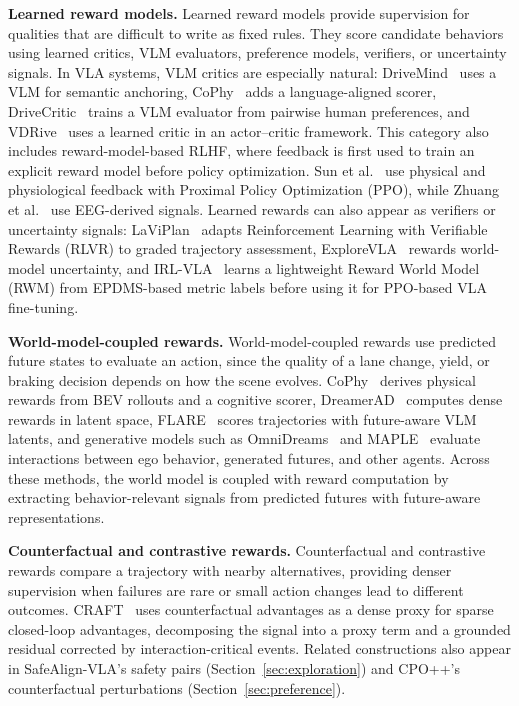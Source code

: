 \documentclass[runningheads]{llncs}
\begin{document}
\textbf{Learned reward models.}
Learned reward models provide supervision for qualities that are difficult to write as fixed rules. They score candidate behaviors using learned critics, VLM evaluators, preference models, verifiers, or uncertainty signals. In VLA systems, VLM critics are especially natural: DriveMind~\cite{drivemind2025} uses a VLM for semantic anchoring, CoPhy~\cite{cophy2026} adds a language-aligned scorer, DriveCritic~\cite{drivecritic2025} trains a VLM evaluator from pairwise human preferences, and VDRive~\cite{vdrive2025} uses a learned critic in an actor–critic framework. This category also includes reward-model-based RLHF, where feedback is first used to train an explicit reward model before policy optimization. Sun et al.~\cite{sun2024rlhf} use physical and physiological feedback with Proximal Policy Optimization (PPO), while Zhuang et al.~\cite{neurocog2026} use EEG-derived signals. Learned rewards can also appear as verifiers or uncertainty signals: LaViPlan~\cite{laviplan2025} adapts Reinforcement Learning with Verifiable Rewards (RLVR) to graded trajectory assessment, ExploreVLA~\cite{explorevla2026} rewards world-model uncertainty, and IRL-VLA~\cite{jiang2025irl} learns a lightweight Reward World Model (RWM) from EPDMS-based metric labels before using it for PPO-based VLA fine-tuning.

\textbf{World-model-coupled rewards.}
World-model-coupled rewards use predicted future states to evaluate an action, since the quality of a lane change, yield, or braking decision depends on how the scene evolves. CoPhy~\cite{cophy2026} derives physical rewards from BEV rollouts and a cognitive scorer, DreamerAD~\cite{dreamerad2026} computes dense rewards in latent space, FLARE~\cite{flare2026} scores trajectories with future-aware VLM latents, and generative models such as OmniDreams~\cite{omnidreams2026} and MAPLE~\cite{maple2026} evaluate interactions between ego behavior, generated futures, and other agents. Across these methods, the world model is coupled with reward computation by extracting behavior-relevant signals from predicted futures with future-aware representations.


\textbf{Counterfactual and contrastive rewards.}
Counterfactual and contrastive rewards compare a trajectory with nearby alternatives, providing denser supervision when failures are rare or small action changes lead to different outcomes. CRAFT~\cite{craft2026} uses counterfactual advantages as a dense proxy for sparse closed-loop advantages, decomposing the signal into a proxy term and a grounded residual corrected by interaction-critical events. Related constructions also appear in SafeAlign-VLA’s safety pairs (Section~\ref{sec:exploration}) and CPO++’s counterfactual perturbations (Section~\ref{sec:preference}).
\end{document}
